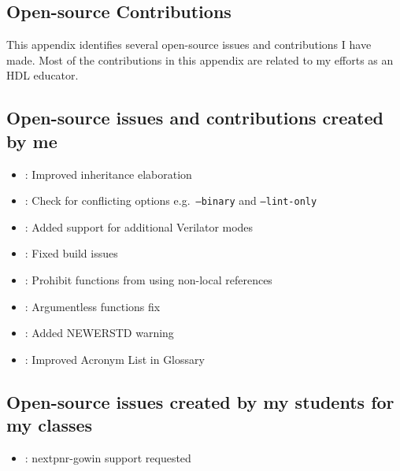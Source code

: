
\begin{appendices}



\chapter{Open-source Contributions}
\label{appx:contributions}

This appendix identifies several open-source issues and contributions I have made.
Most of the contributions in this appendix are related to my efforts as an HDL educator.

\section{Open-source issues and contributions created by me}

\begin{itemize}
    \item [\mergedicon] : Improved inheritance elaboration
    \item [\mergedicon] : Check for conflicting options e.g.\ \texttt{--binary} and \texttt{--lint-only}
    \item [\mergedicon] : Added support for additional Verilator modes
    \item [\mergedicon] : Fixed build issues
    \item [\mergedicon] : Prohibit functions from using non-local references
    \item [\mergedicon] : Argumentless functions fix
    \item [\mergedicon] : Added NEWERSTD warning
    \item [\mergedicon] : Improved Acronym List in Glossary
\end{itemize}

\section{Open-source issues created by my students for my classes}

\begin{itemize}
    \item [\issueclosedicon] : nextpnr-gowin support requested
\end{itemize}




\end{appendices}
